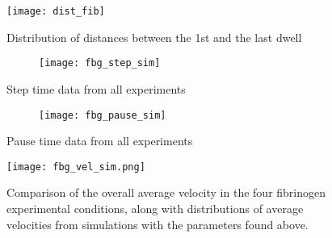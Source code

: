 \documentclass{article}
\begin{document}
\begin{figure}
  \centering
  \texttt{[image: dist\_fib]}
  \caption{Distribution of distances between the 1st and the last
    dwell}
  \label{fig:fbg-dist}
\end{figure}

\begin{figure}
  \centering
  \begin{subfigure}{\textwidth}
    \texttt{[image: fbg\_step\_sim]}
  \end{subfigure}
  \caption{Step time data from all experiments}
  \label{fig:step-time}
\end{figure}

\begin{figure}
  \centering
  \begin{subfigure}{\textwidth}
    \texttt{[image: fbg\_pause\_sim]}
  \end{subfigure}
  \caption{Pause time data from all experiments}
  \label{fig:pause-time}
\end{figure}


\begin{figure}
  \centering
  \texttt{[image: fbg\_vel\_sim.png]}
  \caption{Comparison of the overall average velocity in the four
    fibrinogen experimental conditions, along with distributions of
    average velocities from simulations with the parameters found
    above.}
  \label{fig:avg-vel-fib}
\end{figure}
\end{document}
